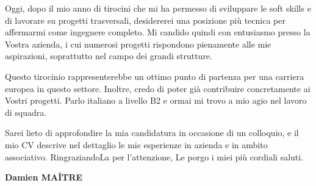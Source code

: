 \documentclass[a4paper,11pt]{extarticle}
\begin{document}
Oggi, dopo il mio anno di tirocini che mi ha permesso di sviluppare le soft skills e di lavorare su progetti trasversali, desidererei una posizione più tecnica per affermarmi come ingegnere completo. Mi candido quindi con entusiasmo presso la Vostra azienda, i cui numerosi progetti rispondono pienamente alle mie aspirazioni, soprattutto nel campo dei grandi strutture.

Questo tirocinio rappresenterebbe un ottimo punto di partenza per una carriera europea in questo settore. Inoltre, credo di poter già contribuire concretamente ai Vostri progetti. Parlo italiano a livello B2 e ormai mi trovo a mio agio nel lavoro di squadra.

Sarei lieto di approfondire la mia candidatura in occasione di un colloquio, e il mio CV descrive nel dettaglio le mie esperienze in azienda e in ambito associativo. RingraziandoLa per l'attenzione, Le porgo i miei più cordiali saluti.

\vspace{14pt}
\begin{flushright}
  \textbf{\color{accent}Damien MAÎTRE}
\end{flushright}
\end{document}

